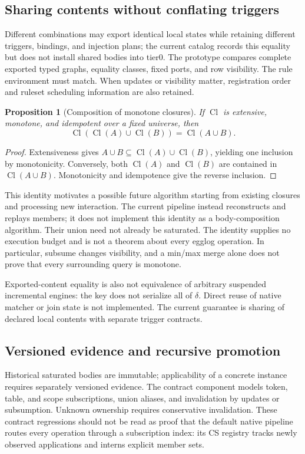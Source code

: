 \documentclass[11pt,a4paper]{article}
\newtheorem{proposition}{Proposition}
\newcommand{\Cl}{\operatorname{Cl}}
\begin{document}
\subsection{Sharing contents without conflating triggers}
Different combinations may export identical local states while retaining different
triggers, bindings, and injection plans; the current catalog records this equality but
does not install shared bodies into tier0. The prototype compares
complete exported typed graphs, equality classes, fixed ports, and row visibility.
The rule environment must match. When updates or visibility matter, registration
order and ruleset scheduling information are also retained.

\begin{proposition}[Composition of monotone closures]
If $\Cl$ is extensive, monotone, and idempotent over a fixed universe, then
\begin{equation}
 \Cl(\Cl(A)\cup\Cl(B))=\Cl(A\cup B).
\end{equation}
\end{proposition}
\begin{proof}
Extensiveness gives $A\cup B\subseteq\Cl(A)\cup\Cl(B)$, yielding one inclusion
by monotonicity. Conversely, both $\Cl(A)$ and $\Cl(B)$ are contained in
$\Cl(A\cup B)$. Monotonicity and idempotence give the reverse inclusion.
\end{proof}

This identity motivates a possible future algorithm starting from existing closures
and processing new interaction. The current pipeline instead reconstructs and
replays members; it does not implement this identity as a body-composition algorithm. Their union need not already be saturated. The identity supplies no
execution budget and is not a theorem about every egglog operation. In
particular, subsume changes visibility, and a min/max merge alone does not prove
that every surrounding query is monotone.

Exported-content equality is also not equivalence of arbitrary suspended
incremental engines: the key does not serialize all of $\delta$. Direct reuse of
native matcher or join state is not implemented. The current guarantee is sharing
of declared local contents with separate trigger contracts.

\subsection{Versioned evidence and recursive promotion}
Historical saturated bodies are immutable; applicability of a concrete instance
requires separately versioned evidence. The contract component models token,
table, and scope subscriptions, union aliases, and invalidation by updates or
subsumption. Unknown ownership requires conservative invalidation. These contract
regressions should not be read as proof that the default native pipeline routes
every operation through a subscription index: its CS registry tracks newly
observed applications and interns explicit member sets.
\end{document}
